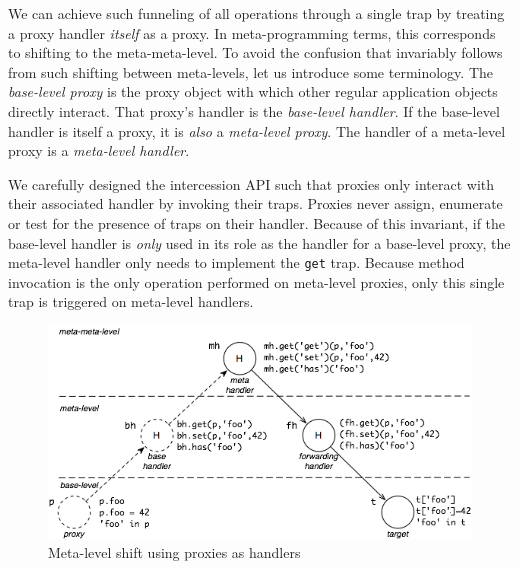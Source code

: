 \documentclass{acm_proc_article-sp}
\begin{document}
We can achieve such funneling of all operations through a single trap by treating a proxy handler \emph{itself} as a proxy. In meta-programming terms, this corresponds to shifting to the meta-meta-level. To avoid the confusion that invariably follows from such shifting between meta-levels, let us introduce some terminology. The \emph{base-level proxy} is the proxy object with which other regular application objects directly interact. That proxy's handler is the \emph{base-level handler}. If the base-level handler is itself a proxy, it is \emph{also} a \emph{meta-level proxy}. The handler of a meta-level proxy is a \emph{meta-level handler}.

We carefully designed the intercession API such that proxies only interact with their associated handler by invoking their traps. Proxies never assign, enumerate or test for the presence of traps on their handler. Because of this invariant, if the base-level handler is \emph{only} used in its role as the handler for a base-level proxy, the meta-level handler only needs to implement the \texttt{get} trap. Because method invocation is the only operation performed on meta-level proxies, only this single trap is triggered on meta-level handlers.


\begin{figure}[htbp]
  \centering
    \includegraphics[width=1.0\columnwidth]{MetaLevelShifting.png}
  \caption{Meta-level shift using proxies as handlers}
  \label{fig:shift}
\end{figure}
\end{document}
